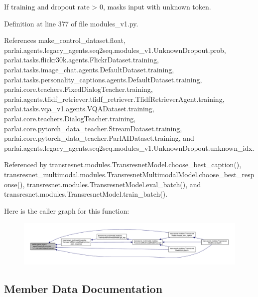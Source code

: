 \begin{DoxyVerb}If training and dropout rate > 0, masks input with unknown token.\end{DoxyVerb}
 

Definition at line 377 of file modules\+\_\+v1.\+py.



References make\+\_\+control\+\_\+dataset.\+float, parlai.\+agents.\+legacy\+\_\+agents.\+seq2seq.\+modules\+\_\+v1.\+Unknown\+Dropout.\+prob, parlai.\+tasks.\+flickr30k.\+agents.\+Flickr\+Dataset.\+training, parlai.\+tasks.\+image\+\_\+chat.\+agents.\+Default\+Dataset.\+training, parlai.\+tasks.\+personality\+\_\+captions.\+agents.\+Default\+Dataset.\+training, parlai.\+core.\+teachers.\+Fixed\+Dialog\+Teacher.\+training, parlai.\+agents.\+tfidf\+\_\+retriever.\+tfidf\+\_\+retriever.\+Tfidf\+Retriever\+Agent.\+training, parlai.\+tasks.\+vqa\+\_\+v1.\+agents.\+V\+Q\+A\+Dataset.\+training, parlai.\+core.\+teachers.\+Dialog\+Teacher.\+training, parlai.\+core.\+pytorch\+\_\+data\+\_\+teacher.\+Stream\+Dataset.\+training, parlai.\+core.\+pytorch\+\_\+data\+\_\+teacher.\+Parl\+A\+I\+Dataset.\+training, and parlai.\+agents.\+legacy\+\_\+agents.\+seq2seq.\+modules\+\_\+v1.\+Unknown\+Dropout.\+unknown\+\_\+idx.



Referenced by transresnet.\+modules.\+Transresnet\+Model.\+choose\+\_\+best\+\_\+caption(), transresnet\+\_\+multimodal.\+modules.\+Transresnet\+Multimodal\+Model.\+choose\+\_\+best\+\_\+response(), transresnet.\+modules.\+Transresnet\+Model.\+eval\+\_\+batch(), and transresnet.\+modules.\+Transresnet\+Model.\+train\+\_\+batch().

Here is the caller graph for this function\+:
\nopagebreak
\begin{figure}[H]
\begin{center}
\leavevmode
\includegraphics[width=350pt]{classparlai_1_1agents_1_1legacy__agents_1_1seq2seq_1_1modules__v1_1_1UnknownDropout_a4527e73a4211e888db806e4526c0126e_icgraph}
\end{center}
\end{figure}


\subsection{Member Data Documentation}
\mbox{\label{classparlai_1_1agents_1_1legacy__agents_1_1seq2seq_1_1modules__v1_1_1UnknownDropout_a7d5b061b69c0857aec6dfe3f3f5cd9ed}} 
